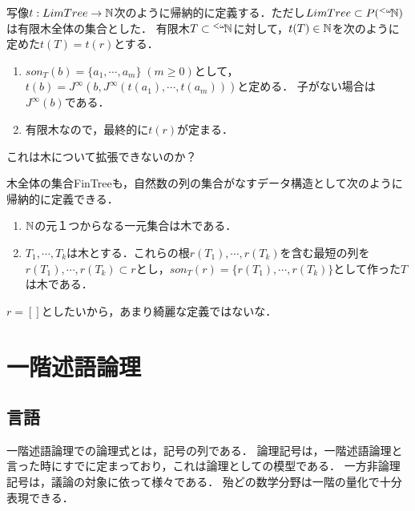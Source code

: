 \documentclass[uplatex, 12pt, dvipdfmx]{jsreport}
\begin{document}
\begin{definition}[有限木の自然数によるコード]
    写像$t:LimTree \to \mathbb{N}$次のように帰納的に定義する．ただし$LimTree\subset P({}^{<\omega}\!\mathbb{N})$は有限木全体の集合とした．
    有限木$T\subset{}^{<\omega}\!\mathbb{N}$に対して，$t(T)\in\mathbb{N}$を次のように定めた$t(T)=t(r)$とする．
    \begin{enumerate}
        \item $son_T(b)=\{a_1,\cdots,a_m\}\;(m\ge 0)$として，$t(b)=J^\infty(b,J^\infty(t(a_1),\cdots,t(a_m)))$と定める．
        子がない場合は$J^\infty(b)$である．
        \item 有限木なので，最終的に$t(r)$が定まる．
    \end{enumerate}
\end{definition}
\begin{remark}
    これは木について拡張できないのか？
\end{remark}
\begin{remark}
    木全体の集合FinTreeも，自然数の列の集合がなすデータ構造として次のように帰納的に定義できる．
    \begin{enumerate}
        \item $\mathbb{N}$の元１つからなる一元集合は木である．
        \item $T_1,\cdots,T_k$は木とする．これらの根$r(T_1),\cdots,r(T_k)$を含む最短の列を$r(T_1),\cdots,r(T_k)\subset r$とし，$son_T(r)=\{r(T_1),\cdots,r(T_k)\}$として作った$T$は木である．
    \end{enumerate}
    $r=[]$としたいから，あまり綺麗な定義ではないな．
\end{remark}

\section{一階述語論理}

\subsection{言語}

\begin{screen}
    一階述語論理での論理式とは，記号の列である．
    論理記号は，一階述語論理と言った時にすでに定まっており，これは論理としての模型である．
    一方非論理記号は，議論の対象に依って様々である．
    殆どの数学分野は一階の量化で十分表現できる．
\end{screen}
\end{document}
